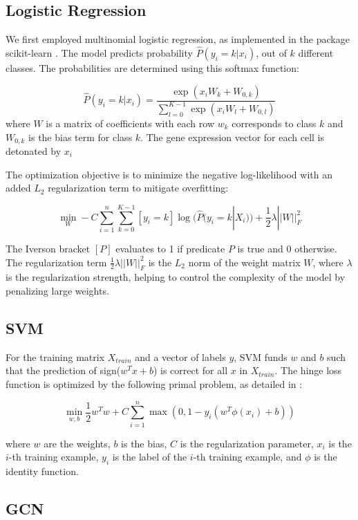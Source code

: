 \documentclass{article}
\begin{document}
\subsection{Logistic Regression}

We first employed multinomial logistic regression, as implemented in the package scikit-learn \cite{pedregosaScikitlearnMachineLearning2011}. The model predicts probability $\hat{P}(y_i = k | x_i)$, out of $k$ different classes. The probabilities are determined using this softmax function:

$$
\hat{P}(y_i = k | x_i) = \frac{\exp(x_i W_k + W_{0,k})}{\sum_{l=0}^{K-1} \exp(x_i W_l + W_{0,l})}
$$
where $W$ is a matrix of coefficients with each row $w_k$ corresponds to class $k$ and $W_{0,k}$ is the bias term for class $k$. The gene expression vector for each cell is detonated by $x_i$

The optimization objective is to minimize the negative log-likelihood with an added $L_2$ regularization term to mitigate overfitting:
 
$$
\min_{W} -C \sum_{i=1}^{n} \sum_{k=0}^{K-1} [y_i = k] \log(\hat{P}(y_i = k | X_i)) + \frac{1}{2} \lambda ||W||_F^2
$$
 
The Iverson bracket $[P]$ evaluates to 1 if predicate $P$ is true and 0 otherwise. The regularization term $\frac{1}{2} \lambda ||W||_F^2$ is the $L_2$ norm of the weight matrix $W$, where $\lambda$ is the regularization strength, helping to control the complexity of the model by penalizing large weights.

\subsection{SVM}

For the training matrix $X_{train}$ and a vector of labels $y$, SVM funds $w$ and $b$ such that the prediction of sign($w^T x + b$) is correct for all $x$ in $X_{train}$. The hinge loss function is optimized by the following primal problem, as detailed in \cite{pedregosaScikitlearnMachineLearning2011}:

$$
\min_{w, b} \frac{1}{2} w^Tw + C \sum_{i=1}^{n} \max(0, 1 - y_i(w^T \phi(x_i) + b))
$$

where $w$ are the weights, $b$ is the bias, $C$ is the regularization parameter, $x_i$ is the $i$-th training example, $y_i$ is the label of the $i$-th training example, and $\phi$ is the identity function.

\subsection{GCN}
\end{document}
